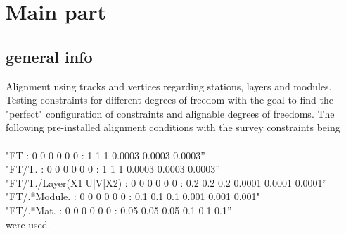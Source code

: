 \chapter{Main part}
\label{sec:story}


\section{general info}

Alignment using tracks and vertices regarding stations, layers and modules. Testing constraints for different degrees of freedom with the goal to find the "perfect" configuration of constraints and alignable degrees of freedoms.
The following pre-installed alignment conditions with the survey constraints being\\
\\
"FT : 0 0 0 0 0 0 : 1 1 1 0.0003 0.0003 0.0003”\\
"FT/T. : 0 0 0 0 0 0 : 1 1 1 0.0003 0.0003 0.0003”\\
"FT/T./Layer(X1|U|V|X2) : 0 0 0 0 0 0 : 0.2 0.2 0.2 0.0001 0.0001 0.0001”\\
"FT/.*Module. : 0 0 0 0 0 0 : 0.1 0.1 0.1 0.001 0.001 0.001"\\
"FT/.*Mat. : 0 0 0 0 0 0 : 0.05 0.05 0.05 0.1 0.1 0.1”\\
were used.

